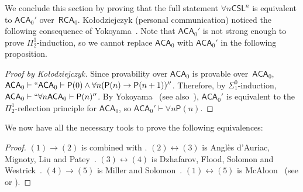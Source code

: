 \documentclass{article}
\newcommand{\Psf}{\mathsf{P}}
\newcommand{\RCA}[0]{\mathsf{RCA}}
\newcommand{\ACA}[0]{\mathsf{ACA}}
\newcommand{\RT}[0]{\mathsf{RT}}
\newcommand{\CSL}[0]{\mathsf{CSL}}
\newcommand{\ODRT}[0]{\mathsf{ODRT}}
\newcommand{\CDRT}[0]{\mathsf{CDRT}}
\def\qt#1{``#1''}%
\newtheorem{theorem}{Theorem}
\numberwithin{theorem}{section}
\newtheorem{proposition}[theorem]{Proposition}
\theoremstyle{definition}
\begin{document}
We conclude this section by proving that the full statement $\forall n \CSL^n$ is equivalent to $\ACA_0'$ over~$\RCA_0$.
Ko{\l}odziejczyk (personal communication) noticed the following consequence of Yokoyama~\cite{yokoyama2023paris}. Note that $\ACA_0'$ is not strong enough to prove $\Pi^1_2$-induction, so we cannot replace $\ACA_0$ with $\ACA_0'$ in the following proposition.

\begin{proof}[Proof by Ko{\l}odziejczyk]
Since provability over $\ACA_0$ is provable over~$\ACA_0$, $\ACA_0 \vdash \qt{\ACA_0 \vdash \Psf(0) \wedge \forall n(\Psf(n) \to \Psf(n+1))}$.
Therefore, by $\Sigma^0_1$-induction, $\ACA_0 \vdash \qt{\forall n \ACA_0 \vdash \Psf(n)}$.
By Yokoyama~\cite{yokoyama2023paris} (see also~\cite{pacheco2022determinacy}), $\ACA_0'$ is equivalent to the $\Pi^1_2$-reflection principle for $\ACA_0$, so $\ACA_0' \vdash \forall n \Psf(n)$.
\end{proof}

We now have all the necessary tools to prove the following equivalences:

\begin{proof}
$(1) \to (2)$ is  combined with .
$(2) \leftrightarrow (3)$ is Anglès d’Auriac, Mignoty, Liu and Patey~\cite[Theorem 6.3]{angles2023carlson}. $(3) \leftrightarrow (4)$ is Dzhafarov, Flood, Solomon and Westrick~\cite[Theorem 3.9]{dzhafarov2021effectiveness}. $(4) \to (5)$ is Miller and Solomon~\cite[Theorem 2.3]{miller2004effectiveness}.
$(1) \leftrightarrow (5)$ is McAloon~\cite{mcaloon1985paris} (see \cite[Theorem 6.27]{hirschfeldt2015slicing} or \cite[Theorem 8.1.6]{dzhafarov2022reverse}).
\end{proof}
\end{document}
